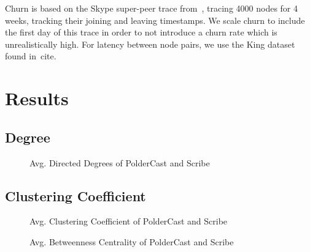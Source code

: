 Churn is based on the Skype super-peer trace from~\cite{}, tracing 4000
nodes for 4 weeks, tracking their joining and leaving timestamps. We
scale churn to include the first day of this trace in order to not
introduce a churn rate which is unrealistically high. For latency
between node pairs, we use the King dataset found in~cite{}.


\section{Results}

\subsection{Degree}

%     

%     

\begin{figure}[H]
    \centering
    \caption{Avg. Directed Degrees of PolderCast and Scribe}
    \label{fig:eval_directedtdegree}
\end{figure}

\subsection{Clustering Coefficient}
\begin{figure}[H]
    \centering
    
    \caption{Avg. Clustering Coefficient of PolderCast and Scribe}
    \label{fig:eval_cc}
\end{figure}


\begin{figure}[H]
    \centering
    
    \caption{Avg. Betweenness Centrality of PolderCast and Scribe}
    \label{fig:eval_betweenness}
\end{figure}

